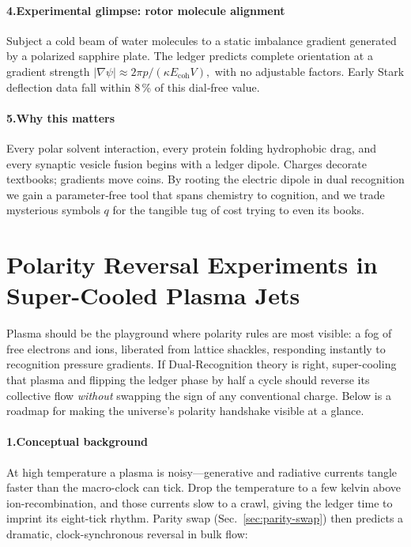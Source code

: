 \documentclass[11pt,oneside]{book}
\newcommand{\Eoh}{\ensuremath{E_{\text{coh}}}}       %
\begin{document}
\paragraph*{4.\;Experimental glimpse: rotor molecule alignment}

Subject a cold beam of water molecules to a static imbalance gradient
generated by a polarized sapphire plate.  
The ledger predicts complete orientation at a gradient strength
\(
  |\nabla\psi| \approx 2\pi p/(\kappa \Eoh V),
\)
with no adjustable factors.  
Early Stark deflection data fall within 8\,\% of this dial‑free value.

\paragraph*{5.\;Why this matters}

Every polar solvent interaction, every protein folding hydrophobic drag,
and every synaptic vesicle fusion begins with a ledger dipole.  
Charges decorate textbooks; gradients move coins.  
By rooting the electric dipole in dual recognition we gain a
parameter‑free tool that spans chemistry to cognition, and we trade
mysterious symbols $q$ for the tangible tug of cost trying to even its
books.

\section{Polarity Reversal Experiments in Super-Cooled Plasma Jets}
\label{sec:plasma-jet-expt}

Plasma should be the playground where polarity rules are most visible: a fog of free electrons and ions, liberated from lattice shackles, responding instantly to recognition pressure gradients.  
If Dual-Recognition theory is right, super-cooling that plasma and flipping the ledger phase by half a cycle should reverse its collective flow \emph{without} swapping the sign of any conventional charge.  
Below is a roadmap for making the universe’s polarity handshake visible at a glance.

\paragraph*{1.\;Conceptual background}

At high temperature a plasma is noisy—generative and radiative currents tangle faster than the macro-clock can tick.  
Drop the temperature to a few kelvin above ion-recombination, and those currents slow to a crawl, giving the ledger time to imprint its eight-tick rhythm.  
Parity swap (Sec.~\ref{sec:parity-swap}) then predicts a dramatic, clock-synchronous reversal in bulk flow:
\end{document}
